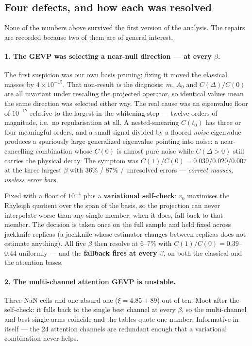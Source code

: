 \documentclass[11pt,a4paper]{article}
\begin{document}
\subsection{Four defects, and how each was resolved}
\label{sec:defects}

None of the numbers above survived the first version of the analysis. The
repairs are recorded because two of them are of general interest.

\paragraph{1. The GEVP was selecting a near-null direction --- at every $\beta$.}
The first suspicion was our own basis pruning; fixing it moved the classical
masses by $4\times10^{-15}$. That non-result \emph{is} the diagnosis: $m$, $A_0$
and $C(\Delta)/C(0)$ are all invariant under rescaling the projected operator,
so identical values mean the same direction was selected either way. The real
cause was an eigenvalue floor of $10^{-12}$ relative to the largest in the
whitening step --- twelve orders of magnitude, i.e.\ no regularisation at all. A
nested-smearing $C(t_0)$ has three or four meaningful orders, and a small signal
divided by a floored \emph{noise} eigenvalue produces a spuriously large
generalized eigenvalue pointing into noise: a near-cancelling combination whose
$C(0)$ is almost pure noise while $C(\Delta>0)$ still carries the physical
decay. The symptom was $C(1)/C(0) = 0.039 / 0.020 / 0.007$ at the three largest
$\beta$ with $36\%$ / $87\%$ / unresolved errors --- \emph{correct masses,
useless error bars}.

Fixed with a floor of $10^{-4}$ plus a \textbf{variational self-check}: $v_0$
maximises the Rayleigh quotient over the span of the basis, so the projection
can never interpolate worse than any single member; when it does, fall back to
that member. The decision is taken once on the full sample and held fixed across
jackknife replicas (a jackknife whose estimator changes between replicas does
not estimate anything). All five $\beta$ then resolve at $6$--$7\%$ with
$C(1)/C(0) = 0.39$--$0.44$ uniformly --- and the \textbf{fallback fires at every
$\beta$}, on both the classical and the attention bases.

\paragraph{2. The multi-channel attention GEVP is unstable.} Three NaN cells and
one absurd one ($\xi = 4.85 \pm 89$) out of ten. Moot after the self-check: it
falls back to the single best channel at every $\beta$, so the multi-channel and
best-single arms coincide and the tables quote one number. Informative in
itself --- the $24$ attention channels are redundant enough that a variational
combination never helps.
\end{document}
